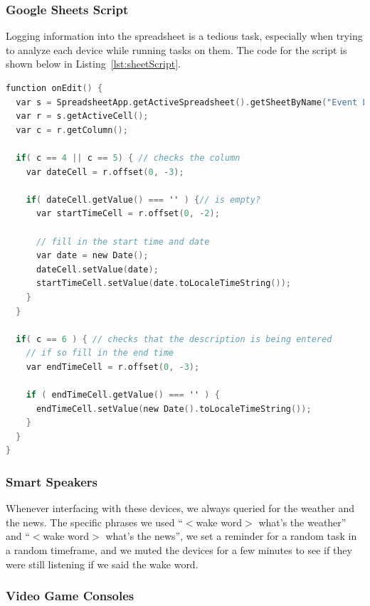 \subsubsection{Google Sheets Script}

Logging information into the spreadsheet is a tedious task, especially when trying to analyze each device while running tasks on them. The code for the script is shown below in Listing~\ref{lst:sheetScript}.

\noindent
\begin{minipage}{\textwidth}
\begin{lstlisting}[basicstyle=\linespread{0.95}\ttfamily, language=C,label={lst:sheetScript},caption={Open and Read from a Socket}]
function onEdit() {
  var s = SpreadsheetApp.getActiveSpreadsheet().getSheetByName("Event Log");
  var r = s.getActiveCell();
  var c = r.getColumn();

  if( c == 4 || c == 5) { // checks the column
    var dateCell = r.offset(0, -3);

    if( dateCell.getValue() === '' ) {// is empty?
      var startTimeCell = r.offset(0, -2);

      // fill in the start time and date
      var date = new Date();
      dateCell.setValue(date);
      startTimeCell.setValue(date.toLocaleTimeString());
    }
  }

  if( c == 6 ) { // checks that the description is being entered
    // if so fill in the end time
    var endTimeCell = r.offset(0, -3);

    if ( endTimeCell.getValue() === '' ) {
      endTimeCell.setValue(new Date().toLocaleTimeString());
    }
  }
}
\end{lstlisting}
\end{minipage}

\subsubsection{Smart Speakers}

Whenever interfacing with these devices, we always queried for the weather and the news. The specific phrases we used ``$<$wake word$>$ what's the weather'' and ``$<$wake word$>$ what's the news'', we  set a reminder for a random task in a random timeframe, and we muted the devices for a few minutes to see if they were still listening if we said the wake word.

\subsubsection{Video Game Consoles}

